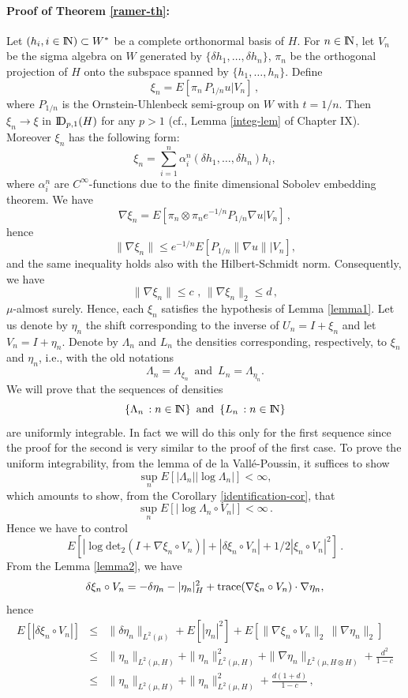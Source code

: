 \documentclass[12pt,a4paper]{book}
\newcommand{\DD}{{\rm I\!D}}
\newcommand{\N}{{\rm I\!N}}
\begin{document}
\paragraph{Proof of Theorem \ref{ramer-th}:} Let $(h_i,i\in \N)\subset
W^*$ be a complete
orthonormal basis of $H$. For $n\in \N$, let $V_n$ be the sigma algebra on $W$
generated by $\{\delta h_1,\ldots, \delta h_n\}$, $\pi_n$ be the
orthogonal projection of $H$ onto the subspace spanned by
$\{h_1,\ldots,h_n\}$. Define
$$
\xi_n=E\left[\pi_n\,P_{1/n}u|V_n\right]\,,
$$
where $P_{1/n}$ is the Ornstein-Uhlenbeck semi-group on $W$ with $t=1/n$. Then
$\xi_n\rightarrow \xi$ in $\DD_{p,1}(H)$ for any $p>1$ (cf., Lemma
\ref{integ-lem} of Chapter IX). Moreover $\xi_n$ has the following
form:
$$
\xi_n=\sum_{i=1}^n \alpha_i^n(\delta h_1,\ldots,\delta h_n)h_i,
$$
where $\alpha_i^n$ are $C^\infty$-functions due to the finite
dimensional  Sobolev embedding theorem. We have
$$
\nabla \xi_n=E\left[\pi_n\otimes \pi_n e^{-1/n}P_{1/n}\nabla u|V_n\right]\,,
$$
hence
$$
\|\nabla \xi_n\|\leq e^{-1/n}E\left[P_{1/n}\|\nabla u\||V_n\right],
$$
and the same inequality holds also with the Hilbert-Schmidt
norm. Consequently, we have
$$
\|\nabla \xi_n\|\leq c\,\,,\,\|\nabla \xi_n\|_2\leq d\,,
$$
$\mu$-almost surely. Hence, each $\xi_n$ satisfies the hypothesis of Lemma
\ref{lemma1}. Let us denote by $\eta_n$ the shift corresponding to the
inverse of  $U_n=I+\xi_n$ and let $V_n=I+\eta_n$. Denote by
$\Lambda_n$ and $L_n$ the densities corresponding,  respectively, to
$\xi_n$ and $\eta_n$, i.e., with the old notations
$$
\Lambda_n=\Lambda_{\xi_n}\,\,\,{\mbox{and}}\,\,\, L_n=\Lambda_{\eta_n}.
$$
We will prove that the sequences of densities
$$
\{\Lambda_n\,:n\in \N\}\,\,\,{\mbox{and}}\,\,\,\{L_n\,:n\in\N\}
$$
are uniformly integrable. In fact we will do this only for the first
sequence since the proof for the second is very similar to the proof
of the first case.
To prove the uniform integrability, from the lemma of de la
Vall\'e-Poussin, it suffices to show
$$
\sup_n E\left[|\Lambda_n||\log\Lambda_n|\right]<\infty,
$$
which amounts to show, from the Corollary \ref{identification-cor}, that
$$
\sup_n E\left[|\log\Lambda_n\circ V_n|\right]<\infty\,.
$$
Hence we have to control
$$
E\left[|\log{\mbox{det}}_2(I+\nabla\xi_n\circ V_n)|+
|\delta\xi_n\circ V_n|+1/2|\xi_n\circ V_n|^2\right]\,.
$$
From the Lemma \ref{lemma2}, we have
$$
\delta \xi_n\circ V_n=-\delta \eta_n-|\eta_n|_H^2+{\mbox{\rm
    trace}}(\nabla \xi_n\circ V_n)\cdot \nabla \eta_n,
$$
hence
\begin{eqnarray*}
E[|\delta \xi_n\circ V_n|]&\leq&\|\delta \eta_n\|_{L^2(\mu)}+E[|\eta_n|^2]+
E[\|\nabla\xi_n\circ V_n\|_2\,\|\nabla \eta_n\|_2]\\
&\leq& \|\eta_n\|_{L^2(\mu,H)}+\|\eta_n\|_{L^2(\mu,H)}^2+
 \|\nabla \eta_n\|_{L^2(\mu,H\otimes H)}+
\frac{d^2}{1-c}\\
&\leq& \|\eta_n\|_{L^2(\mu,H)}+\|\eta_n\|_{L^2(\mu,H)}^2+ \frac{d(1+d)}{1-c}\,,
\end{eqnarray*}
\end{document}
